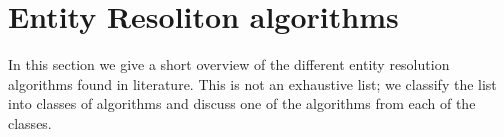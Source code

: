 
\section{Entity Resoliton algorithms}


In this section we give a short overview of the different entity resolution algorithms found in literature.
This is not an exhaustive list; we classify the list into classes of algorithms and discuss one of the algorithms from each of the classes.




